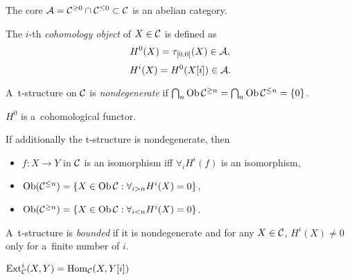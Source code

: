 



    
    \begin{theorem}
        The core $\mathcal{A} = \mathcal{C}^{\geq 0} \cap \mathcal{C}^{\leq 0} \subset \mathcal{C}$ 
        is an abelian category.
    \end{theorem}
    
    \begin{definition}
        The $i$-th {\em cohomology object} of $X \in \mathcal{C}$
        is defined as
        $$H^0(X) = \tau_{[0,0]}(X) \in \mathcal{A},$$
        $$H^i(X) = H^0(X[i]) \in \mathcal{A}.$$
    \end{definition}
    
    \begin{definition}
        A~t-structure on $\mathcal{C}$ is {\em nondegenerate} if 
        $\bigcap_n \operatorname{Ob} \mathcal{C}^{\geq n}
        = \bigcap_n \operatorname{Ob} \mathcal{C}^{\leq n} = \{0\}$.
    \end{definition}

    
    \begin{theorem}
        $H^0$ is a~cohomological functor.
        
        If additionally the t-structure is nondegenerate,
        then
        \begin{itemize}
            \item $f:X \to Y$ in $\mathcal{C}$ is an isomorphism 
            iff $\forall_i H^i(f)$ is an isomorphism,
            \item $\operatorname{Ob}(\mathcal{C}^{\leq n}) = 
            \{ X \in \operatorname{Ob} \mathcal{C}: \forall_{i>n} H^i(X) = 0 \}$,
            \item $\operatorname{Ob}(\mathcal{C}^{\geq n}) =
            \{ X \in \operatorname{Ob} \mathcal{C}: \forall_{i<n} H^i(X) = 0 \}$.
        \end{itemize}
    \end{theorem}
    
    \begin{definition}
        A~t-structure is {\em bounded} if it is nondegenerate
        and for any $X \in \mathcal{C}$,
        $H^i(X) \neq 0$ only for a~finite number of $i$.
    \end{definition}
    
    \begin{definition}[$\Ext$]
        $\operatorname{Ext}_{\mathcal{C}}^i(X,Y) = \operatorname{Hom}_{\mathcal{C}}(X,Y[i])$
    \end{definition}
    

